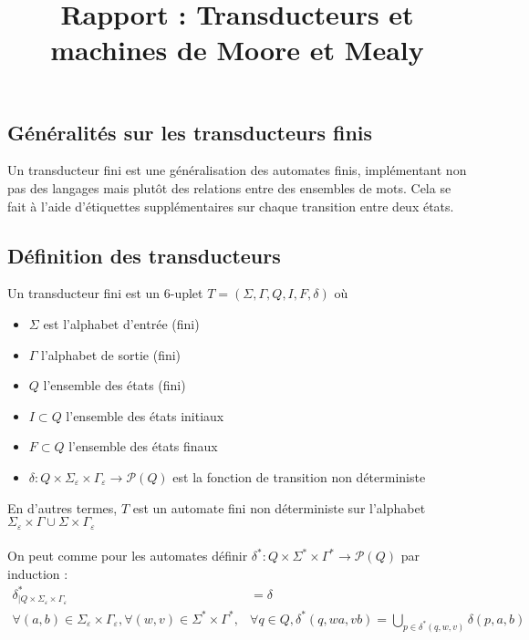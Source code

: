 \documentclass{scrartcl}
\title{Rapport : Transducteurs et machines de Moore et Mealy}
\begin{document}
\maketitle


\begin{flushleft}

\tableofcontents

\section{Généralités sur les transducteurs finis}

Un transducteur fini est une généralisation des automates finis, implémentant non pas des langages mais plutôt des
relations entre des ensembles de mots. Cela se fait à l'aide d'étiquettes supplémentaires sur chaque transition
entre deux états.

\subsection{Définition des transducteurs}

\begin{define}
    Un transducteur fini est un 6-uplet $T = (\Sigma, \Gamma, Q, I, F, \delta)$ où
    \begin{itemize}
        \item $\Sigma$ est l'alphabet d'entrée (fini)\\
        \item $\Gamma$ l'alphabet de sortie (fini)\\
        \item $Q$ l'ensemble des états (fini)\\
        \item $I \subset Q$ l'ensemble des états initiaux
        \item $F \subset Q$ l'ensemble des états finaux
        \item $\delta : Q \times \Sigma_{\varepsilon} \times \Gamma_{\varepsilon} \longrightarrow \mathcal{P}(Q)$ est
        la fonction de transition non déterministe
    \end{itemize}
\end{define}

En d'autres termes, $T$ est un automate fini non déterministe sur l'alphabet $\Sigma_{\varepsilon} \times \Gamma \cup \Sigma \times \Gamma_{\varepsilon}$
\\~\\
On peut comme pour les automates définir
$\delta^* : Q \times \Sigma^* \times \Gamma^* \longrightarrow \mathcal{P}(Q)$ par induction :
\begin{equation*}
    \begin{split}
        \delta^*_{\mid Q \times \Sigma_{\varepsilon} \times \Gamma_{\varepsilon}} &= \delta\\
        \forall (a, b) \in \Sigma_{\varepsilon} \times \Gamma_{\varepsilon},
        \forall (w, v) \in \Sigma^* \times \Gamma^*, &\forall q \in Q, \delta^*(q, wa, vb) = 
        \bigcup_{p \in \delta^*(q, w, v)} \delta(p, a, b)
    \end{split}
\end{equation*}


\end{flushleft}
\end{document}

